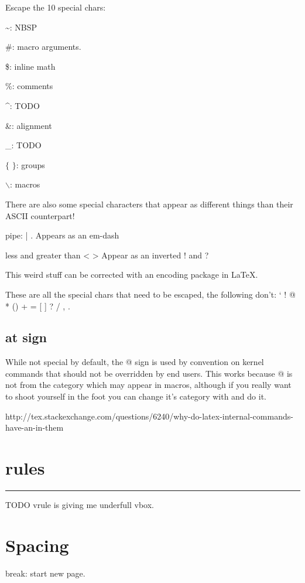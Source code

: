   Escape the 10 special chars:

  \~{}: NBSP

  \#: macro arguments.

  \$: inline math

  \%: comments

  \^{}: TODO

  \&: alignment

  \_: TODO

  $\{$ $\}$: groups

  $\backslash$: macros

  There are also some special characters that appear as different things than their ASCII counterpart!

  \item pipe: | . Appears as an em-dash
  \item less and greater than < > Appear as an inverted ! and ?

  This weird stuff can be corrected with an encoding package in LaTeX.

  These are all the special chars that need to be escaped, the following don't: ` ! @ * () + = [  ] ? / , .

  \subsection{at sign}

    While not special by default, the @ sign is used by convention on kernel commands that should not be overridden by end users. This works because @ is not from the category which may appear in macros, although if you really want to shoot yourself in the foot you can change it's category with  and do it.

    http://tex.stackexchange.com/questions/6240/why-do-latex-internal-commands-have-an-in-them

\section{rules}

  \hrule

  TODO vrule is giving me underfull vbox.


\section{Spacing}

  \bs break: start new page.


